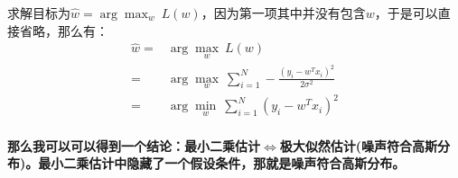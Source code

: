 \documentclass[a4paper]{article}
\numberwithin{equation}{section}
\begin{document}
求解目标为$\hat{w} = \arg\max_w \ L(w)$，因为第一项其中并没有包含$w$，于是可以直接省略，那么有：
\begin{align}
    \hat{w} = & \arg\max_w \ L(w) \\ 
    \nonumber = & \arg\max_w \ \sum_{i=1}^{N}-\frac{(y_i - w^Tx_i)^2}{2\sigma^2} \\
    \nonumber = & \arg\min_w \ \sum_{i=1}^{N} (y_i - w^Tx_i)^2 \\
\end{align}

\textbf{那么我可以可以得到一个结论：最小二乘估计$\Longleftrightarrow$极大似然估计(噪声符合高斯分布)。最小二乘估计中隐藏了一个假设条件，那就是噪声符合高斯分布。}
\end{document}
